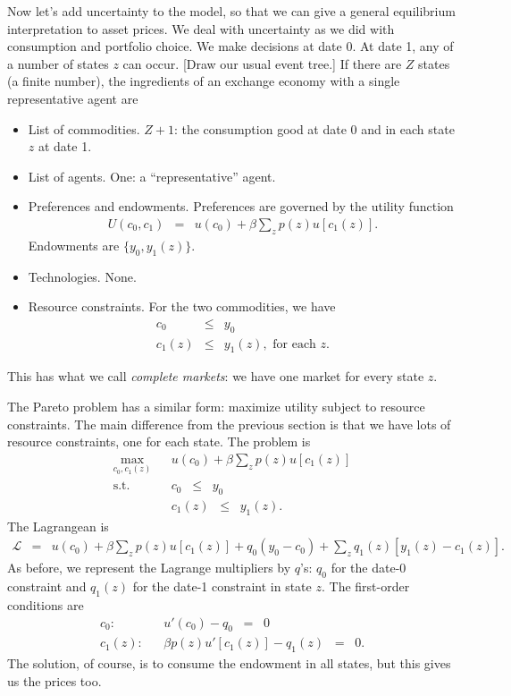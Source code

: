 \documentclass[11pt]{article}
\begin{document}
Now let's add uncertainty to the model, so that we can give a general
equilibrium interpretation to asset prices.
We deal with uncertainty as we did with consumption and portfolio choice.
We make decisions at date 0.
At date 1, any of a number of states $z$ can occur.
[Draw our usual event tree.]
If there are $Z$ states (a finite number), the ingredients of
an exchange economy with a single representative agent are
\begin{itemize}
\item List of commodities.  $Z+1$:  the consumption good at date 0
and in each state $z$ at date 1.
\item List of agents.  One: a ``representative'' agent.
\item Preferences and endowments.  Preferences are governed by the utility function
\begin{eqnarray*}
    U(c_0,c_1) &=& u(c_0) + \beta \sum_z p(z) u[c_1(z)] .
\end{eqnarray*}
Endowments are $\{y_0,y_1(z)\}$.
\item Technologies.  None.
\item Resource constraints.  For the two commodities,
we have
\begin{eqnarray*}
    c_0 &\leq& y_0 \\
    c_1(z) &\leq& y_1(z), \mbox{ for each } z .
\end{eqnarray*}
\end{itemize}
This has what we call {\it complete markets\/}:  we have one market for every state $z$.

The Pareto problem has a similar form:  maximize utility subject to
resource constraints.
The main difference from the previous section is that we have lots of resource
constraints, one for each state.
The problem is
\begin{eqnarray*}
    \max_{c_0,c_1(z)} && u(c_0) + \beta \sum_z p(z) u[c_1(z)] \\
    \mbox{s.t.}   &&  c_0  \;\;\leq\;\; y_0 \\
                  &&  c_1(z) \;\;\leq\;\; y_1(z) .
\end{eqnarray*}
The Lagrangean is
\begin{eqnarray*}
    \mathcal{L} &=&  u(c_0) + \beta \sum_z p(z) u[c_1(z)] + q_0 (y_0 - c_0)
                    + \sum_z q_1(z)  [ y_1(z) - c_1(z)]  .
\end{eqnarray*}
As before, we represent the Lagrange multipliers by $q$'s:
$q_0$ for the date-0 constraint and $q_1(z)$ for the date-1 constraint in state $z$.
The first-order conditions are
\begin{eqnarray*}
    c_0: &&  u'(c_0) - q_0 \;\;=\;\; 0 \\
    c_1(z): &&  \beta p(z) u'[c_1(z)] - q_1(z) \;\;=\;\; 0 .
\end{eqnarray*}
The solution, of course, is to consume the endowment in all states,
but this gives us the prices too.
\end{document}

